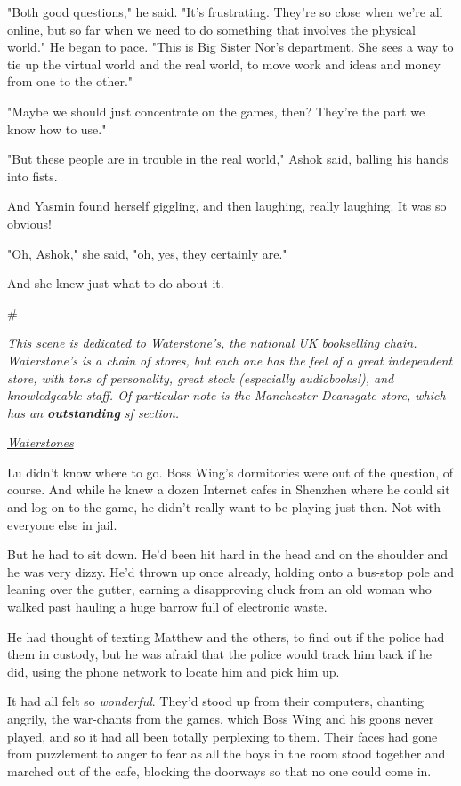 "Both good questions," he said. "It's frustrating. They're so close
when we're all online, but so far when we need to do something that
involves the physical world." He began to pace. "This is Big Sister
Nor's department. She sees a way to tie up the virtual world and
the real world, to move work and ideas and money from one to the
other."

"Maybe we should just concentrate on the games, then? They're the
part we know how to use."

"But these people are in trouble in the real world," Ashok said,
balling his hands into fists.

And Yasmin found herself giggling, and then laughing, really
laughing. It was so obvious!

"Oh, Ashok," she said, "oh, yes, they certainly are."

And she knew just what to do about it.

\#

\emph{This scene is dedicated to Waterstone's, the national UK bookselling chain. Waterstone's is a chain of stores, but each one has the feel of a great independent store, with tons of personality, great stock (especially audiobooks!), and knowledgeable staff. Of particular note is the Manchester Deansgate store, which has an \textbf{outstanding} sf section.}

\emph{\href{http://www.waterstones.com}{Waterstones}}

Lu didn't know where to go. Boss Wing's dormitories were out of the
question, of course. And while he knew a dozen Internet cafes in
Shenzhen where he could sit and log on to the game, he didn't
really want to be playing just then. Not with everyone else in
jail.

But he had to sit down. He'd been hit hard in the head and on the
shoulder and he was very dizzy. He'd thrown up once already,
holding onto a bus-stop pole and leaning over the gutter, earning a
disapproving cluck from an old woman who walked past hauling a huge
barrow full of electronic waste.

He had thought of texting Matthew and the others, to find out if
the police had them in custody, but he was afraid that the police
would track him back if he did, using the phone network to locate
him and pick him up.

It had all felt so \emph{wonderful}. They'd stood up from their
computers, chanting angrily, the war-chants from the games, which
Boss Wing and his goons never played, and so it had all been
totally perplexing to them. Their faces had gone from puzzlement to
anger to fear as all the boys in the room stood together and
marched out of the cafe, blocking the doorways so that no one could
come in.

